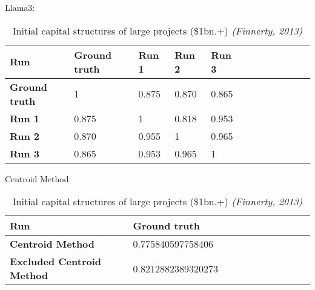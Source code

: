 Llama3:
\begin{table}[h]
    \centering
    \begin{tabular}{@{}llllllllllll@{}}\toprule
        \textbf{Run}  & \textbf{Ground truth} & \textbf{Run 1} & \textbf{Run 2} & \textbf{Run 3}\\ 
        \midrule
        \textbf{Ground truth} & 1  & 0.875 & 0.870 & 0.865\\
        \hdashline
        \textbf{Run 1} & 0.875 & 1 & 0.818& 0.953\\
        \hdashline
        \textbf{Run 2} & 0.870 & 0.955 & 1 & 0.965\\
        \hdashline
        \textbf{Run 3} & 0.865 & 0.953 & 0.965 & 1\\
        \bottomrule
    \end{tabular}
    \caption{Initial capital structures of large projects (\$1bn.+) \emph{(Finnerty, 2013)}}
\end{table}

Centroid Method:
\begin{table}[ht]
    \centering
    \begin{tabular}{@{}lllllllllll@{}}\toprule
        \textbf{Run} & \textbf{Ground truth}\\
        \midrule
        \textbf{Centroid Method} & 0.775840597758406\\
        \hdashline
        \textbf{Excluded Centroid Method} & 0.8212882389320273\\
        \bottomrule
    \end{tabular}
    \caption{Initial capital structures of large projects (\$1bn.+) \emph{(Finnerty, 2013)}}
\end{table}

